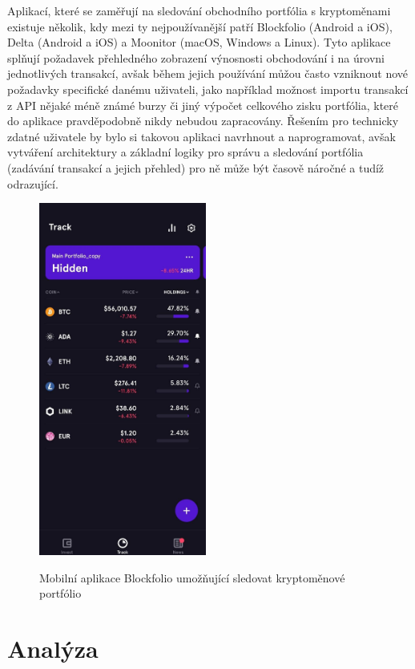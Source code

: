 \documentclass[12pt, a4paper]{article}
\begin{document}
    Aplikací, které se zaměřují na sledování obchodního portfólia s kryptoměnami existuje několik, kdy mezi ty nejpoužívanější patří Blockfolio\cite{blockfolio2021} (Android a iOS), Delta\cite{delta2021} (Android a iOS) a Moonitor\cite{moonitor2021} (macOS, Windows a Linux). Tyto aplikace splňují požadavek přehledného zobrazení výnosnosti obchodování i na úrovni jednotlivých transakcí, avšak během jejich používání můžou často vzniknout nové požadavky specifické danému uživateli, jako například možnost importu transakcí z API nějaké méně známé burzy či jiný výpočet celkového zisku portfólia, které do aplikace pravděpodobně nikdy nebudou zapracovány. Řešením pro technicky zdatné uživatele by bylo si takovou aplikaci navrhnout a naprogramovat, avšak vytváření architektury a základní logiky pro správu a sledování portfólia (zadávání transakcí a jejich přehled) pro ně může být časově náročné a tudíž odrazující.

    \begin{figure}[!ht]
        \centering
        {\includegraphics[width=5.5cm]{img/blockfolio.png}}
        \caption{Mobilní aplikace Blockfolio umožňující sledovat kryptoměnové portfólio}
        \label{fig:simple-vrp-czech}
    \end{figure}


    \section{Analýza}
    
\end{document}
